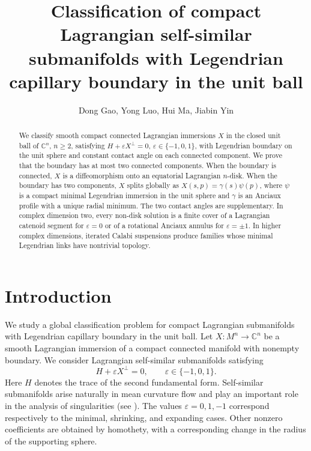 \documentclass[11pt,a4paper]{article}
\title{Classification of compact Lagrangian self-similar submanifolds with Legendrian capillary boundary in the unit ball}
\author{Dong Gao, Yong Luo, Hui Ma, Jiabin Yin}
\date{}
\numberwithin{equation}{section}
\newcommand{\C}{\mathbb C}
\begin{document}
\maketitle

\begingroup
\renewcommand{\thefootnote}{}
\endgroup

\begin{abstract}
We classify smooth compact connected Lagrangian immersions $X$ in the closed
unit ball of $\C^n$, $n\ge2$, satisfying $H+\varepsilon X^\perp=0$,
$\varepsilon\in\{-1,0,1\}$, with Legendrian boundary on the unit sphere and
constant contact angle on each connected component.  We prove that the boundary has at
most two connected components.  When the boundary is connected, $X$ is a
diffeomorphism onto an equatorial Lagrangian $n$-disk.  When the boundary has
two components, $X$ splits globally as $X(s,p)=\gamma(s)\psi(p)$, where
$\psi$ is a compact minimal Legendrian immersion in the unit sphere and $\gamma$ is an Anciaux profile with a
unique radial minimum. The two contact angles are supplementary.  
In complex dimension two, every non-disk solution is a finite cover of a
Lagrangian catenoid segment for $\varepsilon=0$ or of a rotational Anciaux
annulus for $\varepsilon=\pm1$.  In higher complex dimensions, iterated Calabi
suspensions produce families whose minimal Legendrian links have nontrivial
topology.
\end{abstract}

\section{Introduction}

We study a global classification problem for compact Lagrangian
submanifolds with Legendrian capillary boundary in the unit ball.  Let
$
        X:M^n\longrightarrow\C^n
$
be a smooth Lagrangian immersion of a compact connected manifold with nonempty
boundary.  We consider Lagrangian self-similar submanifolds satisfying 
\begin{equation}\label{eq:intro-self-similar}
        H+\varepsilon X^\perp=0,
        \qquad \varepsilon\in\{-1,0,1\}.
\end{equation}
Here $H$ denotes the trace of the second fundamental form. Self-similar submanifolds arise naturally in mean curvature flow and play an important role in the analysis of singularities (see \cite{Huisken1990}). The values
$\varepsilon=0,1,-1$ correspond respectively to the minimal, shrinking, and
expanding cases.  Other nonzero coefficients are obtained by homothety, with a
corresponding change in the radius of the supporting sphere. 
\end{document}
